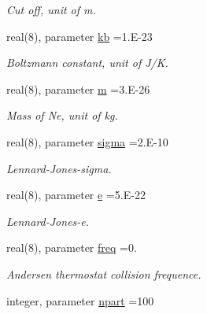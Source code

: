 \begin{DoxyCompactItemize}
\begin{DoxyCompactList}\small\item\em Cut off, unit of m. \end{DoxyCompactList}\item 
\hypertarget{classconstants_ab4958b39254b3611080f409078ae55d2}{}real(8), parameter \hyperlink{classconstants_ab4958b39254b3611080f409078ae55d2}{kb} =1.\+E-\/23\label{classconstants_ab4958b39254b3611080f409078ae55d2}

\begin{DoxyCompactList}\small\item\em Boltzmann constant, unit of J/\+K. \end{DoxyCompactList}\item 
\hypertarget{classconstants_abaa88fe1a97daa75fc864e49790600e7}{}real(8), parameter \hyperlink{classconstants_abaa88fe1a97daa75fc864e49790600e7}{m} =3.\+E-\/26\label{classconstants_abaa88fe1a97daa75fc864e49790600e7}

\begin{DoxyCompactList}\small\item\em Mass of Ne, unit of kg. \end{DoxyCompactList}\item 
\hypertarget{classconstants_ae052611b857a440301d5338bb561c6dd}{}real(8), parameter \hyperlink{classconstants_ae052611b857a440301d5338bb561c6dd}{sigma} =2.\+E-\/10\label{classconstants_ae052611b857a440301d5338bb561c6dd}

\begin{DoxyCompactList}\small\item\em Lennard-\/\+Jones-\/sigma. \end{DoxyCompactList}\item 
\hypertarget{classconstants_afa8791920a3df2649a39898b488801e8}{}real(8), parameter \hyperlink{classconstants_afa8791920a3df2649a39898b488801e8}{e} =5.\+E-\/22\label{classconstants_afa8791920a3df2649a39898b488801e8}

\begin{DoxyCompactList}\small\item\em Lennard-\/\+Jones-\/e. \end{DoxyCompactList}\item 
\hypertarget{classconstants_a35b01af93f569b11b9b7aa7d6e5389cb}{}real(8), parameter \hyperlink{classconstants_a35b01af93f569b11b9b7aa7d6e5389cb}{freq} =0.\label{classconstants_a35b01af93f569b11b9b7aa7d6e5389cb}

\begin{DoxyCompactList}\small\item\em Andersen thermostat collision frequence. \end{DoxyCompactList}\item 
\hypertarget{classconstants_a95c456691d999b8df55f4b6df27e6010}{}integer, parameter \hyperlink{classconstants_a95c456691d999b8df55f4b6df27e6010}{npart} =100\label{classconstants_a95c456691d999b8df55f4b6df27e6010}


\end{DoxyCompactItemize}
